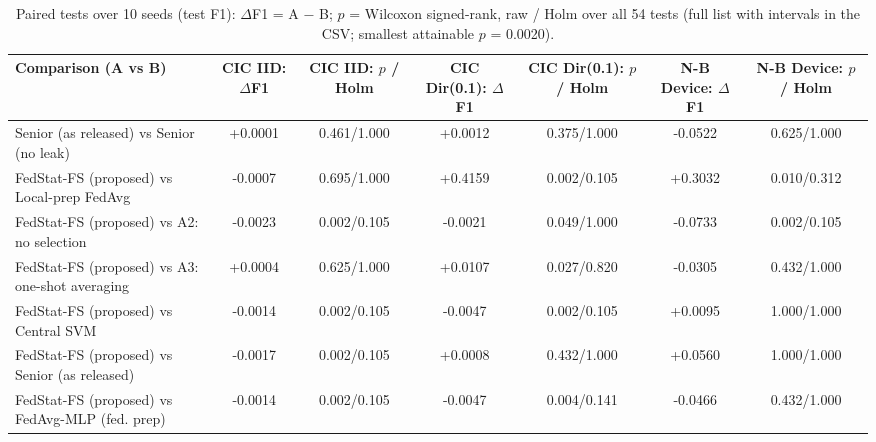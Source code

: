 \begin{table}[t]
\centering
\caption{Paired tests over 10 seeds (test F1): $\Delta$F1 = A $-$ B; $p$ = Wilcoxon signed-rank, raw / Holm over all 54 tests (full list with intervals in the CSV; smallest attainable $p$ = 0.0020).}
\label{tab:sig}
\tiny
\setlength{\tabcolsep}{2.4pt}
\begin{tabular}{lcccccc}
\toprule
Comparison (A vs B) & CIC IID: $\Delta$F1 & CIC IID: $p$ / Holm & CIC Dir(0.1): $\Delta$F1 & CIC Dir(0.1): $p$ / Holm & N-B Device: $\Delta$F1 & N-B Device: $p$ / Holm \\
\midrule
Senior (as released) vs Senior (no leak) & +0.0001 & 0.461/1.000 & +0.0012 & 0.375/1.000 & -0.0522 & 0.625/1.000 \\
FedStat-FS (proposed) vs Local-prep FedAvg & -0.0007 & 0.695/1.000 & +0.4159 & 0.002/0.105 & +0.3032 & 0.010/0.312 \\
FedStat-FS (proposed) vs A2: no selection & -0.0023 & 0.002/0.105 & -0.0021 & 0.049/1.000 & -0.0733 & 0.002/0.105 \\
FedStat-FS (proposed) vs A3: one-shot averaging & +0.0004 & 0.625/1.000 & +0.0107 & 0.027/0.820 & -0.0305 & 0.432/1.000 \\
FedStat-FS (proposed) vs Central SVM & -0.0014 & 0.002/0.105 & -0.0047 & 0.002/0.105 & +0.0095 & 1.000/1.000 \\
FedStat-FS (proposed) vs Senior (as released) & -0.0017 & 0.002/0.105 & +0.0008 & 0.432/1.000 & +0.0560 & 1.000/1.000 \\
FedStat-FS (proposed) vs FedAvg-MLP (fed. prep) & -0.0014 & 0.002/0.105 & -0.0047 & 0.004/0.141 & -0.0466 & 0.432/1.000 \\
\bottomrule
\end{tabular}
\end{table}